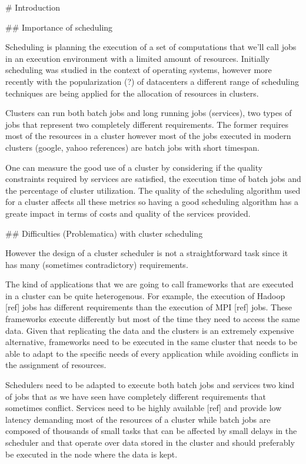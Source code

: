 # Introduction

## Importance of scheduling

Scheduling is planning the execution of a
set of computations that we'll call jobs in an execution environment
with a limited amount of resources. Initially scheduling was studied
in the context of operating systems, however more recently with the
popularization (?) of datacenters a different range of scheduling
techniques are being applied for the allocation of resources in
clusters. 

Clusters can run both batch jobs and long running jobs (services), two
types of jobs that represent two completely different requirements.
The former requires most of the resources in a cluster however most of
the jobs executed in modern clusters (google, yahoo references) are
batch jobs with short timespan.

One can measure the good use of a cluster by considering if the
quality constraints required by services are satisfied, the execution
time of batch jobs and the percentage of cluster utilization. The
quality of the scheduling algorithm used for a cluster affects all
these metrics so having a good scheduling algorithm has a greate
impact in terms of costs and quality of the services provided.

## Difficulties (Problematica) with cluster scheduling

However the design of a cluster scheduler is not a straightforward
task since it has many (sometimes contradictory) requirements.

The kind of applications that we are going to call frameworks
that are executed in a cluster can be quite
heterogenous. For example, the execution of Hadoop [ref]
jobs has different requirements than the execution of MPI [ref]
jobs. These frameworks execute differently but most of the
time they need to access the same data. Given that replicating the
data and the clusters is an extremely expensive alternative, frameworks
need to be executed in the same cluster that needs to be able to adapt
to the specific needs of every application while avoiding conflicts in
the assignment of resources.

Schedulers need to be adapted to execute both batch jobs and services
two kind of jobs that as we have seen have completely different
requirements that sometimes conflict. Services need to be highly
available [ref] and provide low latency demanding most of the
resources of a cluster while batch jobs are composed of thousands of small
tasks that can be affected by small delays in the scheduler and that
operate over data stored in the cluster and should
preferably be executed in the node where the data is kept.

